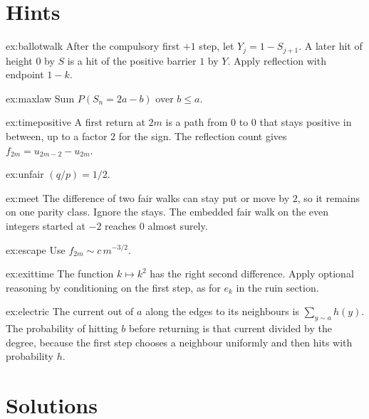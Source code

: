 \section{Hints}

\begin{hint}{ex:ballotwalk}
After the compulsory first $+1$ step, let $Y_j=1-S_{j+1}$. A later hit of height $0$ by $S$ is a hit of the positive barrier $1$ by $Y$. Apply reflection with endpoint $1-k$.
\end{hint}
\begin{hint}{ex:maxlaw}
Sum $P(S_n=2a-b)$ over $b\le a$.
\end{hint}
\begin{hint}{ex:timepositive}
A first return at $2m$ is a path from $0$ to $0$ that stays positive in between, up to a factor $2$ for the sign. The reflection count gives $f_{2m}=u_{2m-2}-u_{2m}$.
\end{hint}
\begin{hint}{ex:unfair}
$(q/p)=1/2$.
\end{hint}
\begin{hint}{ex:meet}
The difference of two fair walks can stay put or move by $2$, so it remains on one parity class. Ignore the stays. The embedded fair walk on the even integers started at $-2$ reaches $0$ almost surely.
\end{hint}
\begin{hint}{ex:escape}
Use $f_{2m}\sim c\,m^{-3/2}$.
\end{hint}
\begin{hint}{ex:exittime}
The function $k\mapsto k^2$ has the right second difference. Apply optional reasoning by conditioning on the first step, as for $e_k$ in the ruin section.
\end{hint}
\begin{hint}{ex:electric}
The current out of $a$ along the edges to its neighbours is $\sum_{y\sim a}h(y)$. The probability of hitting $b$ before returning is that current divided by the degree, because the first step chooses a neighbour uniformly and then hits with probability $h$.
\end{hint}

\section{Solutions}


